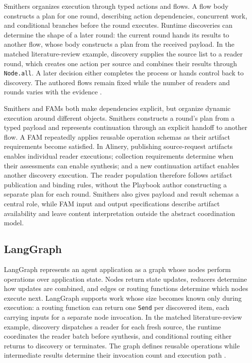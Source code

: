 \documentclass[letterpaper]{article}
\theoremstyle{definition}
\begin{document}
Smithers organizes execution through typed actions and flows. A flow body
constructs a plan for one round, describing action dependencies, concurrent
work, and conditional branches before the round executes. Runtime discoveries
can determine the shape of a later round: the current round hands its results
to another flow, whose body constructs a plan from the received payload. In
the matched literature-review example, discovery supplies the source list to
a reader round, which creates one action per source and combines their results
through \texttt{Node.all}. A later decision either completes the process or
hands control back to discovery. The authored flows remain fixed while the
number of readers and rounds varies with the evidence
\cite{smithers2026plans,smithers2026rounds}.

Smithers and FAMs both make dependencies explicit, but organize dynamic
execution around different objects. Smithers constructs a round's plan from
a typed payload and represents continuation through an explicit handoff to
another flow. A FAM repeatedly applies reusable operation schemas as their
artifact requirements become satisfied. In Alinery, publishing source-request
artifacts enables individual reader executions; collection requirements
determine when their assessments can enable synthesis; and a new continuation
artifact enables another discovery execution. The reader population therefore
follows artifact publication and binding rules, without the Playbook author
constructing a separate plan for each round. Smithers also gives payload and
result schemas a central role, while FAM input and output specifications
describe artifact availability and leave content interpretation outside the
abstract coordination model.

\subsection{LangGraph}

LangGraph represents an agent application as a graph whose nodes perform
operations over application state. Nodes return state updates, reducers
determine how updates are combined, and edges or routing functions determine
which nodes execute next. LangGraph supports work whose size becomes known
only during execution: a routing function can return one \texttt{Send} per
discovered item, each carrying inputs for a separate node invocation. In the
matched literature-review example, discovery dispatches a reader for each
fresh source, the runtime coordinates the reader batch before synthesis, and
conditional routing either returns to discovery or terminates. The graph
defines reusable operations while intermediate results determine their
invocation count and execution path
\cite{langchain2026graphapi,langchain2026pregel}.
\end{document}

